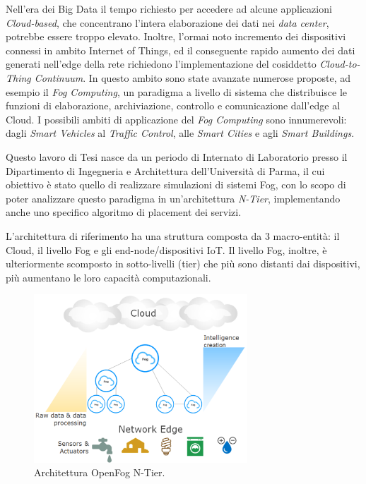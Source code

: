 \documentclass[a4paper,11pt]{article}
\begin{document}
	\maketitle

Nell'era dei Big Data il tempo richiesto per accedere ad alcune applicazioni \textit{Cloud-based}, che concentrano l'intera elaborazione dei dati nei \textit{data center}, potrebbe essere troppo elevato. Inoltre, l'ormai noto incremento dei dispositivi connessi in ambito Internet of Things, ed il conseguente rapido aumento dei dati generati nell'edge della rete richiedono l'implementazione del cosiddetto \textit{Cloud-to-Thing Continuum}. In questo ambito sono state avanzate numerose proposte, ad esempio il \textit{Fog Computing}, un paradigma a livello di sistema che distribuisce le funzioni di elaborazione, archiviazione, controllo e comunicazione dall'edge al Cloud. I possibili ambiti di applicazione del \textit{Fog Computing} sono innumerevoli: dagli \textit{Smart Vehicles} al \textit{Traffic Control}, alle \textit{Smart Cities} e agli \textit{Smart Buildings}.

Questo lavoro di Tesi nasce da un periodo di Internato di Laboratorio presso il Dipartimento di Ingegneria e Architettura dell'Università di Parma, il cui obiettivo è stato quello di realizzare simulazioni di sistemi Fog, con lo scopo di poter analizzare questo paradigma in un'architettura \textit{N-Tier}, implementando anche uno specifico algoritmo di placement dei servizi.

L'architettura di riferimento ha una struttura composta da 3 macro-entità: il Cloud, il livello Fog e gli end-node/dispositivi IoT. Il livello Fog, inoltre, è ulteriormente scomposto in sotto-livelli (tier) che più sono distanti dai dispositivi, più aumentano le loro capacità computazionali.

\begin{figure}[!ht]
  \includegraphics[width=8cm]{images/FogCloudToThingContinuum}
  \centering
  \caption[Architettura OpenFog N-Tier]{Architettura OpenFog N-Tier.}
  \label{fig:ntier_architecture}
\end{figure}
\end{document}

